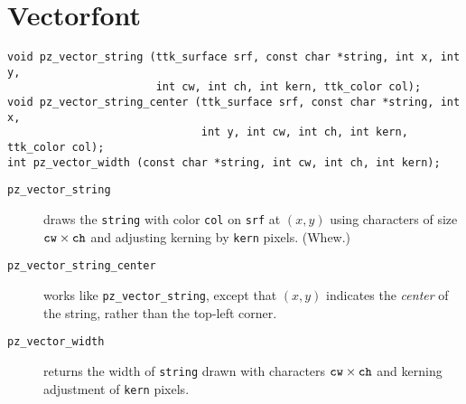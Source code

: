 \documentclass[12pt,letterpaper]{report}
\let\ttt\tt
\def\tt{\def\_{{\ttt\char`\_}}\ttt}
\begin{document}
\section{Vectorfont}
\begin{verbatim}
void pz_vector_string (ttk_surface srf, const char *string, int x, int y,
                       int cw, int ch, int kern, ttk_color col);
void pz_vector_string_center (ttk_surface srf, const char *string, int x,
                              int y, int cw, int ch, int kern, ttk_color col);
int pz_vector_width (const char *string, int cw, int ch, int kern);
\end{verbatim}
\begin{description}
\item[{\tt pz_vector_string}] draws the \verb|string| with color \verb|col| on \verb|srf| at $(x,y)$ using
characters of size $\verb|cw|\times\verb|ch|$ and adjusting kerning by \verb|kern| pixels. (Whew.)
\item[{\tt pz_vector_string_center}] works like \verb|pz_vector_string|, except that $(x,y)$ indicates
the {\it center} of the string, rather than the top-left corner.
\item[{\tt pz_vector_width}] returns the width of \verb|string| drawn with characters $\verb|cw|\times\verb|ch|$ and kerning adjustment of \verb|kern| pixels.
\end{description}
\end{document}
